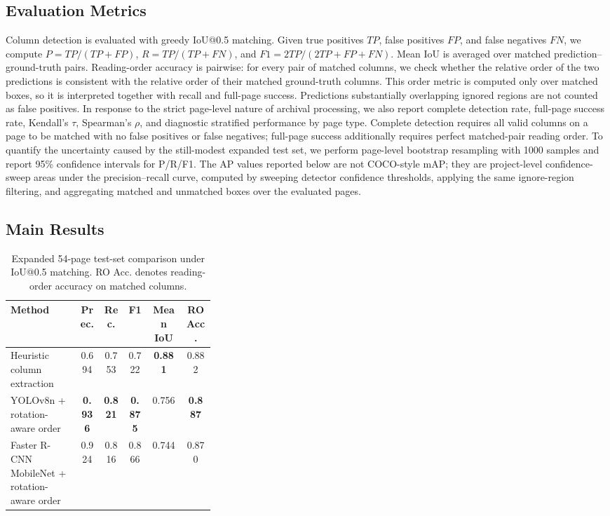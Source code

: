 \documentclass[pdflatex,sn-mathphys-num]{sn-jnl}
\begin{document}
\subsection{Evaluation Metrics}
Column detection is evaluated with greedy IoU@0.5 matching. Given true positives $TP$, false positives $FP$, and false negatives $FN$, we compute $P=TP/(TP+FP)$, $R=TP/(TP+FN)$, and $F1=2TP/(2TP+FP+FN)$. Mean IoU is averaged over matched prediction--ground-truth pairs. Reading-order accuracy is pairwise: for every pair of matched columns, we check whether the relative order of the two predictions is consistent with the relative order of their matched ground-truth columns. This order metric is computed only over matched boxes, so it is interpreted together with recall and full-page success. Predictions substantially overlapping ignored regions are not counted as false positives. In response to the strict page-level nature of archival processing, we also report complete detection rate, full-page success rate, Kendall's $\tau$, Spearman's $\rho$, and diagnostic stratified performance by page type. Complete detection requires all valid columns on a page to be matched with no false positives or false negatives; full-page success additionally requires perfect matched-pair reading order. To quantify the uncertainty caused by the still-modest expanded test set, we perform page-level bootstrap resampling with 1000 samples and report 95\% confidence intervals for P/R/F1. The AP values reported below are not COCO-style mAP; they are project-level confidence-sweep areas under the precision--recall curve, computed by sweeping detector confidence thresholds, applying the same ignore-region filtering, and aggregating matched and unmatched boxes over the evaluated pages.

\subsection{Main Results}
\begin{table}[t]
\centering
\scriptsize\setlength{\tabcolsep}{3pt}
\caption{Expanded 54-page test-set comparison under IoU@0.5 matching. RO Acc. denotes reading-order accuracy on matched columns.}
\label{tab:main_results}
\begin{tabular}{p{0.34\linewidth}ccccc}
\toprule
Method & Prec. & Rec. & F1 & Mean IoU & RO Acc. \\
\midrule
Heuristic column extraction & 0.694 & 0.753 & 0.722 & \textbf{0.881} & 0.882 \\
YOLOv8n + rotation-aware order & \textbf{0.936} & \textbf{0.821} & \textbf{0.875} & 0.756 & \textbf{0.887} \\
Faster R-CNN MobileNet + rotation-aware order & 0.924 & 0.816 & 0.866 & 0.744 & 0.870 \\
\bottomrule
\end{tabular}
\end{table}
\end{document}
